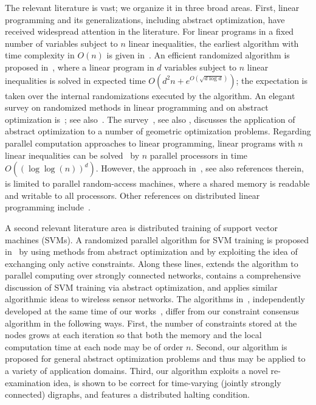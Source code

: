 \documentclass[onecolumn,journal,letterpaper]{IEEEtran}
\newcommand{\e}{e}
\begin{document}
The relevant literature is vast; we organize it in three broad
areas. First, linear programming and its generalizations, including
abstract optimization, have received widespread attention in the
literature. For linear programs in a fixed number of variables subject to
$n$ linear inequalities, the earliest algorithm with time complexity in
$O(n)$ is given in~\cite{NM:84}.  An efficient randomized algorithm is
proposed in~\cite{JM-MS-EW:96}, where a linear program in $d$ variables
subject to $n$ linear inequalities is solved in expected time $O(d^2 n +
\e^{O(\sqrt{d\log d})})$; the expectation is taken over the internal
randomizations executed by the algorithm.  An elegant survey on randomized
methods in linear programming and on abstract optimization
is~\cite{BG-EW:96}; see also~\cite{MG:95,BG-EW:01}.  The
survey~\cite{PKA-SS:01}, see also \cite{PKA-MS:98}, discusses the
application of abstract optimization to a number of geometric optimization
problems.  Regarding parallel computation approaches to linear programming,
linear programs with $n$ linear inequalities can be solved~\cite{MA-NM:96}
by $n$ parallel processors in time $O((\log\log(n))^d)$.  However, the
approach in~\cite{MA-NM:96}, see also references therein, is limited to
parallel random-access machines, where a shared memory is readable and
writable to all processors.  Other references on distributed linear
programming include~\cite{YB-JWB-DR:04,HD-HK:08}.



A second relevant literature area is distributed training of support vector
machines (SVMs).  A randomized parallel algorithm for SVM training is
proposed in~\cite{YL-VR:06} by using methods from abstract optimization and
by exploiting the idea of exchanging only active constraints. Along these
lines, \cite{YL-VR-LV:08} extends the algorithm to parallel computing over
strongly connected networks, \cite{JB-YD-JT-OW:08} contains a comprehensive
discussion of SVM training via abstract optimization, and
\cite{KF-BBL-PT:06} applies similar algorithmic ideas to wireless sensor
networks.  The algorithms in~\cite{YL-VR:06,YL-VR-LV:08}, independently
developed at the same time of our
works~\cite{GN-FB:06d,GN-FB:06z,GN-FB:08x}, differ from our constraint
consensus algorithm in the following ways.  First, the number of
constraints stored at the nodes grows at each iteration so that both the
memory and the local computation time at each node may be of order $n$.
Second, our algorithm is proposed for general abstract optimization
problems and thus may be applied to a variety of application
domains. Third, our algorithm exploits a novel re-examination idea, is
shown to be correct for time-varying (jointly strongly connected) digraphs,
and features a distributed halting condition.
\end{document}
